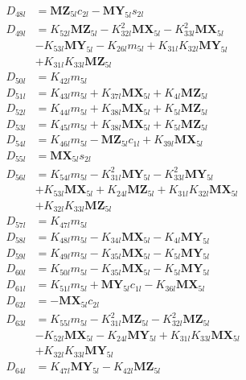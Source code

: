 \begin{multicols}{2}
\begin{align}
D_{48l} &= \mathbf{MZ}_{5l}c_{2l} - \mathbf{MY}_{5l}s_{2l} \nonumber \\
D_{49l} &= K_{52l}\mathbf{MZ}_{5l} - K_{32l}^2\mathbf{MX}_{5l} - K_{33l}^2\mathbf{MX}_{5l}  \nonumber \\
&- K_{53l}\mathbf{MY}_{5l} - K_{26l}m_{5l} + K_{31l}K_{32l}\mathbf{MY}_{5l}  \nonumber \\
&+ K_{31l}K_{33l}\mathbf{MZ}_{5l} \nonumber \\
D_{50l} &= K_{42l}m_{5l} \nonumber \\
D_{51l} &= K_{43l}m_{5l} + K_{37l}\mathbf{MX}_{5l} + K_{4l}\mathbf{MZ}_{5l} \nonumber \\
D_{52l} &= K_{44l}m_{5l} + K_{38l}\mathbf{MX}_{5l} + K_{5l}\mathbf{MZ}_{5l} \nonumber \\
D_{53l} &= K_{45l}m_{5l} + K_{38l}\mathbf{MX}_{5l} + K_{5l}\mathbf{MZ}_{5l} \nonumber \\
D_{54l} &= K_{46l}m_{5l} - \mathbf{MZ}_{5l}c_{1l} + K_{39l}\mathbf{MX}_{5l} \nonumber \\
D_{55l} &= \mathbf{MX}_{5l}s_{2l} \nonumber \\
D_{56l} &= K_{54l}m_{5l} - K_{31l}^2\mathbf{MY}_{5l} - K_{33l}^2\mathbf{MY}_{5l}  \nonumber \\
&+ K_{53l}\mathbf{MX}_{5l} + K_{24l}\mathbf{MZ}_{5l} + K_{31l}K_{32l}\mathbf{MX}_{5l}  \nonumber \\
&+ K_{32l}K_{33l}\mathbf{MZ}_{5l} \nonumber \\
D_{57l} &= K_{47l}m_{5l} \nonumber \\
D_{58l} &= K_{48l}m_{5l} - K_{34l}\mathbf{MX}_{5l} - K_{4l}\mathbf{MY}_{5l} \nonumber \\
D_{59l} &= K_{49l}m_{5l} - K_{35l}\mathbf{MX}_{5l} - K_{5l}\mathbf{MY}_{5l} \nonumber \\
D_{60l} &= K_{50l}m_{5l} - K_{35l}\mathbf{MX}_{5l} - K_{5l}\mathbf{MY}_{5l} \nonumber \\
D_{61l} &= K_{51l}m_{5l} + \mathbf{MY}_{5l}c_{1l} - K_{36l}\mathbf{MX}_{5l} \nonumber \\
D_{62l} &= -\mathbf{MX}_{5l}c_{2l} \nonumber \\
D_{63l} &= K_{55l}m_{5l} - K_{31l}^2\mathbf{MZ}_{5l} - K_{32l}^2\mathbf{MZ}_{5l}  \nonumber \\
&- K_{52l}\mathbf{MX}_{5l} - K_{24l}\mathbf{MY}_{5l} + K_{31l}K_{33l}\mathbf{MX}_{5l}  \nonumber \\
&+ K_{32l}K_{33l}\mathbf{MY}_{5l} \nonumber \\
D_{64l} &= K_{47l}\mathbf{MY}_{5l} - K_{42l}\mathbf{MZ}_{5l} \nonumber \\

\end{align}
\end{multicols}
